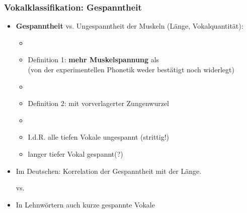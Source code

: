 
\begin{frame}
\frametitle{Vokalklassifikation: Gespanntheit}

	\begin{itemize}
		\item \textbf{Gespanntheit} vs. Ungespanntheit der Muskeln (Länge, Vokalquantität):
		
		\begin{itemize}
			\item[]
			\item Definition 1: \textipa{[ i:, y:, u:, o: ]} \textbf{mehr Muskelspannung} als \textipa{[ I, Y, U , O ]}\\
			(von der experimentellen Phonetik weder bestätigt noch widerlegt)
			\item[]
			\item Definition 2: mit vorverlagerter Zungenwurzel
			\item[]
			\item I.\;d.\;R. alle tiefen Vokale \ras ungespannt (strittig!)
			\item langer tiefer Vokal \textipa{[ a: ]} \ras gespannt(?)
		\end{itemize}

	      \item Im Deutschen: Korrelation der Gespanntheit mit der Länge.

		\ea \textipa{[ m i: t @ ]} vs. \textipa{[ m I t @ ]}
		\z

		\item In Lehnwörtern auch kurze gespannte Vokale

		\ea \textipa{[ P i . d e: ]}
		\z
		
	\end{itemize}
	
\end{frame}



